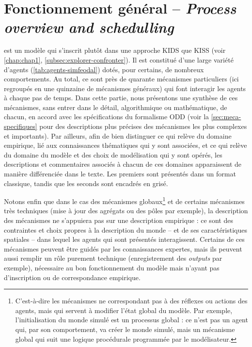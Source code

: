 \let\orisectionmark\sectionmark
\renewcommand\sectionmark[1]{}%
\section[Fonctionnement général -- \textit{Process overview and schedulling}]{Fonctionnement général -- \large{\textit{Process overview and schedulling}}\label{sec:fonctionnement-general}}
\orisectionmark{Fonctionnement général}
\let\sectionmark\orisectionmark

\simfeodal{} est un modèle qui s'inscrit plutôt dans une approche KIDS que KISS (voir \cref{chap:chap1}, \cref{subsec:explorer-confronter}).
Il est constitué d'une large variété d'agents (\cref{tab:agents-simfeodal}) dotés, pour certains, de nombreux comportements.
Au total, ce sont près de quarante mécanismes particuliers (ici regroupés en une quinzaine de mécanismes généraux) qui font interagir les agents à chaque pas de temps.
Dans cette partie, nous présentons une synthèse de ces mécanismes, sans entrer dans le détail, algorithmique ou mathématique, de chacun, en accord avec les spécifications du formalisme ODD (voir la \cref{sec:meca-specifiques} pour des descriptions plus précises des mécanismes les plus complexes et importants).
Par ailleurs, afin de bien distinguer ce qui relève du domaine empirique, lié aux connaissances thématiques qui y sont associées, et ce qui relève du domaine du modèle et des choix de modélisation qui y sont opérés, les descriptions et commentaires associés à chacun de ces domaines apparaissent de manière différenciée dans le texte.
Les premiers sont présentés dans un format classique, tandis que les seconds sont encadrés en grisé.

Notons enfin que dans le cas des \og mécanismes globaux\fg{}\footnote{
	C'est-à-dire les mécanismes ne correspondant pas à des \og réflexes\fg{} ou actions des agents, mais qui servent à modifier l'état \og global\fg{} du modèle.
	Par exemple, l'initialisation du monde simulé est un processus global : ce n'est pas un agent qui, par son comportement, va créer le monde simulé, mais un mécanisme global qui suit une logique procédurale programmée par le modélisateur.
} et de certains mécanismes très techniques (mise à jour des agrégats ou des pôles par exemple), la description des mécanismes ne s'appuiera pas sur une description empirique : ce sont des contraintes et choix propres à la description du monde -- et de ses caractéristiques spatiales -- dans lequel les agents qui sont présentés interagissent.
Certains de ces mécanismes peuvent être guidés par les connaissances expertes, mais ils peuvent aussi remplir un rôle purement technique (enregistrement des \textit{outputs} par exemple), nécessaire au bon fonctionnement du modèle mais n'ayant pas d'inscription ou de correspondance empirique.

